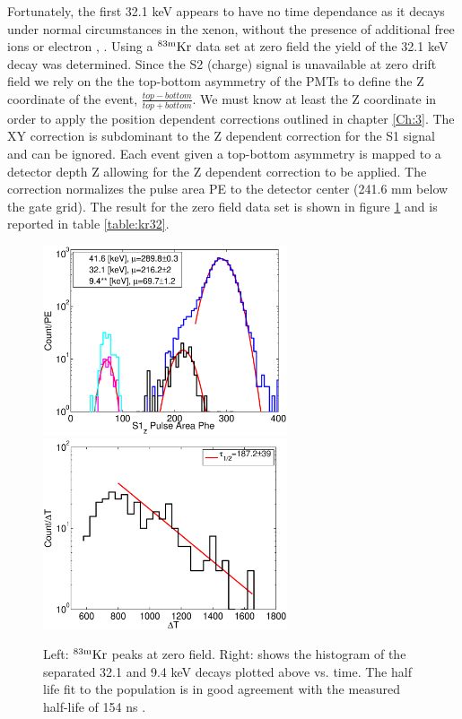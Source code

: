 Fortunately, the first 32.1 keV appears to have no time dependance as it decays under normal circumstances in the xenon, without the presence of additional free ions or electron \cite{Baudis}, \cite{Aprile_LY}. Using a $\rm^{83m}Kr$ data set at zero field the yield of the 32.1 keV decay was determined. Since the S2 (charge) signal is unavailable at zero drift field we rely on the the top-bottom asymmetry of the PMTs to define the Z coordinate of the event, $\frac{top-bottom}{top+bottom} $. We must know at least the Z coordinate in order to apply the position dependent corrections outlined in chapter \ref{Ch:3}. The XY correction is subdominant to the Z dependent correction for the S1 signal and can be ignored. Each event given a top-bottom asymmetry is mapped to a detector depth Z allowing for the Z dependent correction to be applied. The correction normalizes the pulse area PE to the detector center (241.6 mm below the gate grid). The result for the zero field data set is shown in figure \ref{fig:ZeroField_Kr} and is reported in table \ref{table:kr32}.
 
 \begin{figure}[h!]\centering
\includegraphics[width=72mm]{Chapter_Flucs/Figures/S1_Z_no_field_lux10_20131009T1358_cp09670} %
\includegraphics[width=72mm]{Chapter_Flucs/Figures/dT_no_field_2lux10_20131009T1358_cp09670}
\caption{Left: $\rm^{83m}Kr$ peaks at zero field. Right: shows the histogram of the separated 32.1 and 9.4 keV decays plotted above vs. time. The half life fit to the population is in good agreement with the measured half-life of 154 ns \cite{83Kr_HalfLife_1} \cite{83Kr_HalfLife_2}. }
\label{fig:ZeroField_Kr}
\end{figure}

